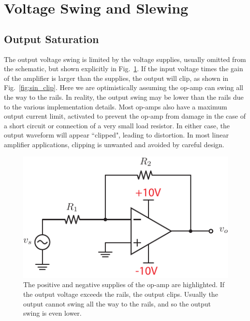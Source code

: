 \section{Voltage Swing and Slewing }


\subsection{Output Saturation}
   
The output voltage swing is limited by the voltage supplies, usually omitted from the schematic, but shown explicitly in Fig.~\ref{fig:opamp_invert_gain_supplies}.  If the input voltage times the gain of the amplifier is larger than the supplies, the output will clip, as shown in Fig.~\ref{fig:sin_clip}.  Here we are optimistically assuming the op-amp can swing all the way to the rails.  In reality, the output swing may be lower than the rails due to the various implementation details.  Most op-amps also have a maximum output current limit, activated to prevent the op-amp from damage in the case of a short circuit or connection of a very small load resistor.  In either case, the output waveform will appear ``clipped", leading to distortion.  In most linear amplifier applications, clipping is unwanted and avoided by careful design.




\begin{figure}[tb]
\begin{center}
\includegraphics[scale=1]{opamp_invert_gain_supplies}
\end{center}
\caption{The positive and negative supplies of the op-amp are highlighted.  If the output voltage exceeds the rails, the output clips.  Usually the output cannot swing all the way to the rails, and so the output swing is even lower.} \label{fig:opamp_invert_gain_supplies}
\end{figure}

